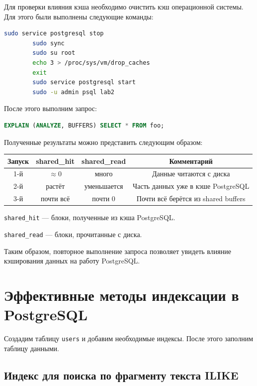 \documentclass{bmstu-sob}
\begin{document}
	Для проверки влияния кэша необходимо очистить кэш операционной системы.
	Для этого были выполнены следующие команды:
	
	\begin{lstlisting}[language=bash]
sudo service postgresql stop
		sudo sync
		sudo su root
		echo 3 > /proc/sys/vm/drop_caches
		exit
		sudo service postgresql start
		sudo -u admin psql lab2
	\end{lstlisting}
	
	
	После этого выполним запрос:
	
	\begin{lstlisting}[language=SQL]
EXPLAIN (ANALYZE, BUFFERS) SELECT * FROM foo;
	\end{lstlisting}
	
	
	Полученные результаты можно представить следующим образом:
	
	\begin{center}
		\begin{tabular}{|c|c|c|c|}
			\hline
			Запуск & shared\_hit & shared\_read & Комментарий \\
			\hline
			1-й & $\approx 0$ & много & Данные читаются с диска \\
			\hline
			2-й & растёт & уменьшается & Часть данных уже в кэше PostgreSQL \\
			\hline
			3-й & почти всё & почти 0 & Почти всё берётся из shared buffers \\
			\hline
		\end{tabular}
	\end{center}
	
	\texttt{shared\_hit} --- блоки, полученные из кэша PostgreSQL.
	
	\texttt{shared\_read} --- блоки, прочитанные с диска.
	
	Таким образом, повторное выполнение запроса позволяет увидеть влияние
	кэширования данных на работу PostgreSQL.
	
	\section{Эффективные методы индексации в PostgreSQL}
	
	Создадим таблицу \texttt{users} и добавим необходимые индексы.
	После этого заполним таблицу данными.
	
	\subsection{Индекс для поиска по фрагменту текста ILIKE}
	
\end{document}

